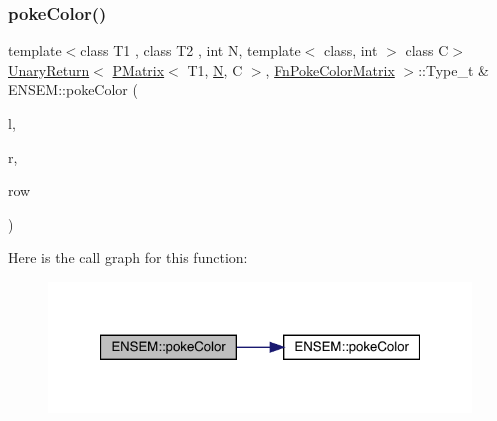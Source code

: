\subsubsection{\texorpdfstring{pokeColor()}{pokeColor()}\hspace{0.1cm}{\footnotesize\ttfamily [1/2]}}
{\footnotesize\ttfamily template$<$class T1 , class T2 , int N, template$<$ class, int $>$ class C$>$ \\
\mbox{\hyperlink{structENSEM_1_1UnaryReturn}{Unary\+Return}}$<$ \mbox{\hyperlink{classENSEM_1_1PMatrix}{P\+Matrix}}$<$ T1, \mbox{\hyperlink{operator__name__util_8cc_a7722c8ecbb62d99aee7ce68b1752f337}{N}}, C $>$, \mbox{\hyperlink{structENSEM_1_1FnPokeColorMatrix}{Fn\+Poke\+Color\+Matrix}} $>$\+::Type\+\_\+t \& E\+N\+S\+E\+M\+::poke\+Color (\begin{DoxyParamCaption}\item[{\mbox{\hyperlink{classENSEM_1_1PMatrix}{P\+Matrix}}$<$ T1, \mbox{\hyperlink{operator__name__util_8cc_a7722c8ecbb62d99aee7ce68b1752f337}{N}}, C $>$ \&}]{l,  }\item[{const \mbox{\hyperlink{classENSEM_1_1PMatrix}{P\+Matrix}}$<$ T2, \mbox{\hyperlink{operator__name__util_8cc_a7722c8ecbb62d99aee7ce68b1752f337}{N}}, C $>$ \&}]{r,  }\item[{int}]{row }\end{DoxyParamCaption})\hspace{0.3cm}{\ttfamily [inline]}}

Here is the call graph for this function\+:\nopagebreak
\begin{figure}[H]
\begin{center}
\leavevmode
\includegraphics[width=321pt]{df/d0a/group__primmatrix_ga0cfeefefe2bd8b4e365ac10d8853664a_cgraph}
\end{center}
\end{figure}
\mbox{\label{group__primmatrix_gab840db69dc60bcb095f46b69353d09f3}} 
